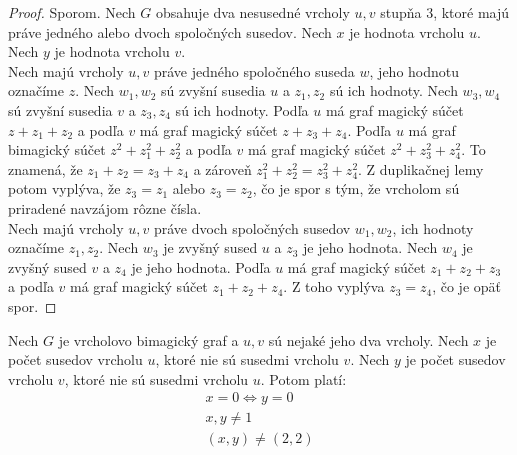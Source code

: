 \begin{proof} Sporom. Nech $G$ obsahuje dva nesusedné vrcholy $u,v$ stupňa 3, ktoré majú práve jedného alebo dvoch spoločných susedov. Nech $x$ je hodnota vrcholu $u$. Nech $y$ je hodnota vrcholu $v$. \\

Nech majú vrcholy $u,v$ práve jedného spoločného suseda $w$, jeho hodnotu označíme $z$. Nech $w_1, w_2$ sú zvyšní susedia $u$ a $z_1, z_2$ sú ich hodnoty. Nech $w_3, w_4$ sú zvyšní susedia $v$ a $z_3, z_4$ sú ich hodnoty. Podľa $u$ má graf magický súčet $z + z_1 + z_2$ a podľa $v$ má graf magický súčet $z + z_3 + z_4$. Podľa $u$ má graf bimagický súčet $z^2 + z^2_1 + z^2_2$ a podľa $v$ má graf magický súčet $z^2 + z^2_3 + z^2_4$. To znamená, že $z_1 + z_2 = z_3 + z_4$ a zároveň $z^2_1 + z^2_2 = z^2_3 + z^2_4$. Z duplikačnej lemy potom vyplýva, že $z_3 = z_1$ alebo $z_3 = z_2$, čo je spor s tým, že vrcholom sú priradené navzájom rôzne čísla. \\

Nech majú vrcholy $u,v$ práve dvoch spoločných susedov $w_1, w_2$, ich hodnoty označíme $z_1, z_2$. Nech $w_3$ je zvyšný sused $u$ a $z_3$ je jeho hodnota. Nech $w_4$ je zvyšný sused $v$ a $z_4$ je jeho hodnota. Podľa $u$ má graf magický súčet $z_1 + z_2 + z_3$ a podľa $v$ má graf magický súčet $z_1 + z_2 + z_4$. Z toho vyplýva $z_3 = z_4$, čo je opäť spor.
\end{proof}

\begin{subtheorem} Nech $G$ je vrcholovo bimagický graf a $u,v$ sú nejaké jeho dva vrcholy. Nech $x$ je počet susedov vrcholu $u$, ktoré nie sú susedmi vrcholu $v$. Nech $y$ je počet susedov vrcholu $v$, ktoré nie sú susedmi vrcholu $u$. Potom platí:
\begin{gather}
\label{vbgcondition}
x = 0 \iff y = 0 \\
x,y \neq 1 \\
(x,y) \neq (2,2)
\end{gather}
\end{subtheorem}

